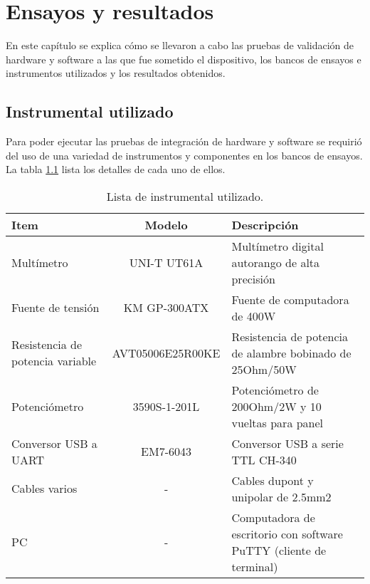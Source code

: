 
\chapter{Ensayos y resultados} %

\label{Chapter4} %


En este capítulo se explica cómo se llevaron a cabo las pruebas de validación de hardware y software a las que fue sometido el dispositivo, los bancos de ensayos e instrumentos utilizados y los resultados obtenidos.

\section{Instrumental utilizado}

Para poder ejecutar las pruebas de integración de hardware y software se requirió del uso de una variedad de instrumentos y componentes en los bancos de ensayos. La tabla \ref{tab:instrumentos} lista los detalles de cada uno de ellos.

\begin{table}[H]
	\centering
	\caption{Lista de instrumental utilizado.}
	\begin{tabular}{p{3cm} c p{6cm}}
		\toprule
		\textbf{Item} & \textbf{Modelo} & \textbf{Descripción} \\
		\midrule
		Multímetro			& UNI-T UT61A		& Multímetro digital autorango de alta precisión \\
		Fuente de tensión	& KM GP-300ATX		& Fuente de computadora de 400W \\
		Resistencia de potencia variable		& AVT05006E25R00KE	& Resistencia de potencia de alambre bobinado de 25Ohm/50W \\
		Potenciómetro							& 3590S-1-201L & Potenciómetro de 200Ohm/2W y 10 vueltas para panel \\
		Conversor USB a UART					& EM7-6043		& Conversor USB a serie TTL CH-340 \\
		Cables varios							& - 			& Cables dupont y unipolar de 2.5mm2 \\
		PC										& -				& Computadora de escritorio con software PuTTY (cliente de terminal) \\
		\bottomrule
		\hline
	\end{tabular}
	\label{tab:instrumentos}
\end{table}

